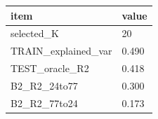 \begin{tabular}{ll}
\hline
item & value \\
\hline
selected\_K & 20 \\
TRAIN\_explained\_var & 0.490 \\
TEST\_oracle\_R2 & 0.418 \\
B2\_R2\_24to77 & 0.300 \\
B2\_R2\_77to24 & 0.173 \\
\hline
\end{tabular}

